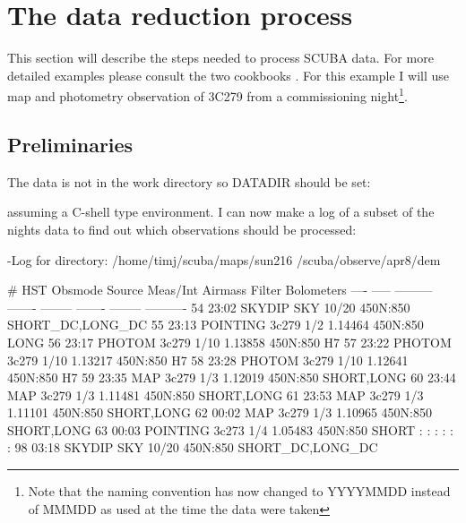 \documentclass[twoside,11pt]{starlink}
\begin{document}
\section{The data reduction process\label{reduction}}

This section will describe the steps needed to process SCUBA data. For more
detailed examples please consult the two cookbooks \cite{S97,SANDELL97}.
For this example I will use map and photometry observation of 3C279
from a commissioning night\footnote{Note that the naming convention has now
changed to YYYYMMDD instead of MMMDD as used at the time the data were
taken}.

\subsection{Preliminaries}
\label{prelim}

The data is not in the work directory so DATADIR should be set:

\begin{terminalv}
\end{terminalv}

assuming a C-shell type environment. I can now make a log of a subset
of the nights data to find out which observations should be processed:

\begin{terminalv}
-Log for directory: /home/timj/scuba/maps/sun216
                    /scuba/observe/apr8/dem

 #    HST    Obsmode   Source   Meas/Int Airmass  Filter  Bolometers
---- -----   --------- -------  -------- ------- -------- ----------
54   23:02   SKYDIP    SKY        10/20          450N:850 SHORT_DC,LONG_DC
55   23:13   POINTING  3c279       1/2   1.14464 450N:850 LONG
56   23:17   PHOTOM    3c279       1/10  1.13858 450N:850 H7
57   23:22   PHOTOM    3c279       1/10  1.13217 450N:850 H7
58   23:28   PHOTOM    3c279       1/10  1.12641 450N:850 H7
59   23:35   MAP       3c279       1/3   1.12019 450N:850 SHORT,LONG
60   23:44   MAP       3c279       1/3   1.11481 450N:850 SHORT,LONG
61   23:53   MAP       3c279       1/3   1.11101 450N:850 SHORT,LONG
62   00:02   MAP       3c279       1/3   1.10965 450N:850 SHORT,LONG
63   00:03   POINTING  3c273       1/4   1.05483 450N:850 SHORT
 :                                  :                :
 :                                  :                :
98   03:18   SKYDIP    SKY        10/20          450N:850 SHORT_DC,LONG_DC
\end{terminalv}
\end{document}
